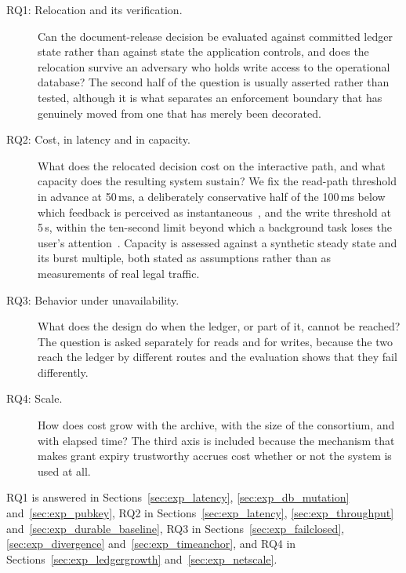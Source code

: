 \documentclass[preprint,12pt]{elsarticle}
\begin{document}
\begin{description}

\item[RQ1: Relocation and its verification.] Can the document-release
decision be evaluated against committed ledger state rather than against state
the application controls, and does the relocation survive an adversary who
holds write access to the operational database? The second half of the question
is usually asserted rather than tested, although it is what separates an
enforcement boundary that has genuinely moved from one that has merely been
decorated.

\item[RQ2: Cost, in latency and in capacity.] What does the relocated
decision cost on the interactive path, and what capacity does the resulting
system sustain? We fix the read-path threshold in advance at 50\,ms, a
deliberately conservative half of the 100\,ms below which feedback is perceived
as instantaneous~\cite{nielsen1993usability}, and the write threshold at
5\,s, within the ten-second limit beyond which a background task loses the
user's attention~\cite{miller1968response,nielsen1993usability}. Capacity is assessed against a synthetic steady state and its
burst multiple, both stated as assumptions rather than as measurements of real
legal traffic.

\item[RQ3: Behavior under unavailability.] What does the design do when the
ledger, or part of it, cannot be reached? The question is asked separately for
reads and for writes, because the two reach the ledger by different routes and
the evaluation shows that they fail differently.

\item[RQ4: Scale.] How does cost grow with the archive, with the size of the
consortium, and with elapsed time? The third axis is included because the
mechanism that makes grant expiry trustworthy accrues cost whether or not the
system is used at all.

\end{description}

RQ1 is answered in Sections~\ref{sec:exp_latency},
\ref{sec:exp_db_mutation} and~\ref{sec:exp_pubkey}, RQ2 in
Sections~\ref{sec:exp_latency}, \ref{sec:exp_throughput}
and~\ref{sec:exp_durable_baseline}, RQ3 in Sections~\ref{sec:exp_failclosed},
\ref{sec:exp_divergence} and~\ref{sec:exp_timeanchor}, and RQ4 in
Sections~\ref{sec:exp_ledgergrowth} and~\ref{sec:exp_netscale}.
\end{document}
